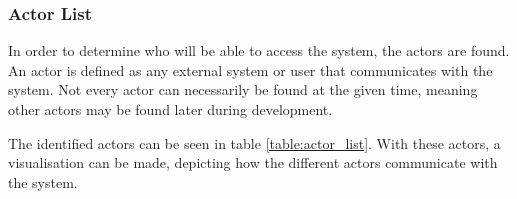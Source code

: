 
\subsubsection{Actor List}
In order to determine who will be able to access the system, the actors are
found. An actor is defined as any external system or user that communicates
with the system. Not every actor can necessarily be found at the given time,
meaning other actors may be found later during development.

The identified actors can be seen in table \ref{table:actor_list}. With these
actors, a visualisation can be made, depicting how the different actors
communicate with the system.

